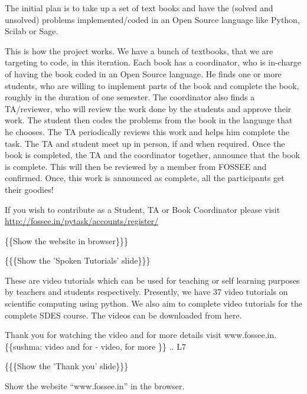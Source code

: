 \documentclass[a4paper,english]{article}
\begin{document}
The initial plan is to take up a set of text books and have the (solved and unsolved) problems implemented/coded in an Open Source language like Python, Scilab or Sage.

This is how the project works. We have a bunch of textbooks, that we are targeting to code, in this iteration. Each book has a coordinator, who is in-charge of having the book coded in an Open Source language. He finds one or more students, who are willing to implement parts of the book and complete the book, roughly in the duration of one semester. The coordinator also finds a TA/reviewer, who will review the work done by the students and approve their work. The student then codes the problems from the book in the language that he chooses. The TA periodically reviews this work and helps him complete the task. The TA and student meet up in person, if and when required. Once the book is completed, the TA and the coordinator together, announce that the book is complete. This will then be reviewed by a member from FOSSEE and confirmed. Once, this work is announced as complete, all the participants get their goodies!

If you wish to contribute as a Student, TA or Book Coordinator please visit \url{http://fossee.in/pytask/accounts/register/}


\{\{Show the website in browser\}\}\}

\{\{\{Show the 'Spoken Tutorials' slide\}\}\}


These are video tutorials which can be used for teaching or self learning purposes by teachers and students respectively. Presently, we have 37 video tutorials on scientific computing using python. We also aim to complete video tutorials for the complete SDES course. The videos can be downloaded from here.

Thank you for watching the video and for more details visit www.fossee.in.
\{\{sushma: video and for - video, for more \}\}
.. L7

\{\{\{Show the 'Thank you' slide\}\}\}

Show the website ``www.fossee.in'' in the browser.
\end{document}
